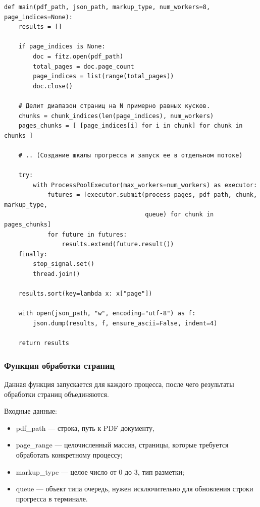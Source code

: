 \begin{lstlisting}[caption={Точка входа, функция main}, label={}]
def main(pdf_path, json_path, markup_type, num_workers=8, page_indices=None):
    results = []

    if page_indices is None:
        doc = fitz.open(pdf_path)
        total_pages = doc.page_count
        page_indices = list(range(total_pages))
        doc.close()

    # Делит диапазон страниц на N примерно равных кусков.
    chunks = chunk_indices(len(page_indices), num_workers)
    pages_chunks = [ [page_indices[i] for i in chunk] for chunk in chunks ]

    # .. (Создание шкалы прогресса и запуск ее в отдельном потоке)

    try:
        with ProcessPoolExecutor(max_workers=num_workers) as executor:
            futures = [executor.submit(process_pages, pdf_path, chunk, markup_type,
                                       queue) for chunk in pages_chunks]
            for future in futures:
                results.extend(future.result())
    finally:
        stop_signal.set()
        thread.join()

    results.sort(key=lambda x: x["page"])

    with open(json_path, "w", encoding="utf-8") as f:
        json.dump(results, f, ensure_ascii=False, indent=4)

    return results
\end{lstlisting}

\subsubsection{Функция обработки страниц}

Данная функция запускается для каждого процесса, после чего результаты обработки страниц объединяются.

Входные данные:
\begin{itemize}
    \item pdf\_path --- строка, путь к PDF документу,
    \item page\_range --- целочисленный массив, страницы, которые требуется обработать конкретному процессу;
    \item markup\_type --- целое число от 0 до 3, тип разметки;
    \item queue --- объект типа очередь, нужен исключительно для обновления строки прогресса в терминале.
\end{itemize}

